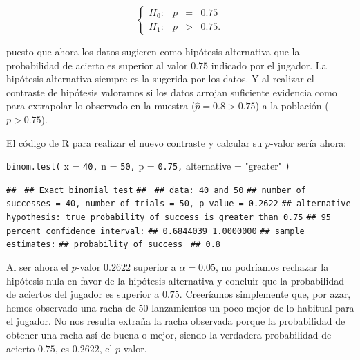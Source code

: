 \documentclass[
  notoc,
  nobib,
  degree=mec]{mnye}
\newenvironment{Shaded}{\begin{snugshade}}{\end{snugshade}}
\newcommand{\AttributeTok}[1]{\textcolor[rgb]{0.77,0.63,0.00}{#1}}
\newcommand{\DecValTok}[1]{\textcolor[rgb]{0.00,0.00,0.81}{#1}}
\newcommand{\FloatTok}[1]{\textcolor[rgb]{0.00,0.00,0.81}{#1}}
\newcommand{\FunctionTok}[1]{\textcolor[rgb]{0.00,0.00,0.00}{#1}}
\newcommand{\NormalTok}[1]{#1}
\newcommand{\StringTok}[1]{\textcolor[rgb]{0.31,0.60,0.02}{#1}}
\renewcommand{\DecValTok}[1]{\textcolor[RGB]{64, 160, 112}{\texttt{#1}}}
\renewcommand{\FloatTok}[1]{\textcolor[RGB]{64, 160, 112}{\texttt{#1}}}
\renewcommand{\FunctionTok}[1]{\textcolor[rgb]{0.13,0.29,0.53}{\texttt{#1}}}
\renewcommand{\NormalTok}[1]{\texttt{#1}}
\begin{document}
\[
  \left\{
  \begin{array}{lrcl}
    H_0:&p&=&0.75\\
    H_1:&p&>&0.75.
  \end{array}
  \right.
\]

puesto que ahora los datos sugieren como hipótesis alternativa que la probabilidad de acierto es superior al valor \(0.75\) indicado por el jugador. La hipótesis alternativa siempre es la sugerida por los datos. Y al realizar el contraste de hipótesis valoramos si los datos arrojan suficiente evidencia como para extrapolar lo observado en la muestra (\(\hat p = 0.8>0.75\)) a la población (\(p>0.75\)).

El código de \textsf{R} para realizar el nuevo contraste y calcular su \(p\)-valor sería ahora:

\begin{Shaded}
\begin{Highlighting}[]
\FunctionTok{binom.test}\NormalTok{(}
  \AttributeTok{x =} \DecValTok{40}\NormalTok{,}
  \AttributeTok{n =} \DecValTok{50}\NormalTok{,}
  \AttributeTok{p =} \FloatTok{0.75}\NormalTok{,}
  \AttributeTok{alternative =} \StringTok{"greater"}
\NormalTok{)}
\end{Highlighting}
\end{Shaded}

\begin{Shaded}
\begin{Highlighting}[]
\NormalTok{\#\# }
\NormalTok{\#\#  Exact binomial test}
\NormalTok{\#\# }
\NormalTok{\#\# data:  40 and 50}
\NormalTok{\#\# number of successes = 40, number of trials = 50, p{-}value = 0.2622}
\NormalTok{\#\# alternative hypothesis: true probability of success is greater than 0.75}
\NormalTok{\#\# 95 percent confidence interval:}
\NormalTok{\#\#  0.6844039 1.0000000}
\NormalTok{\#\# sample estimates:}
\NormalTok{\#\# probability of success }
\NormalTok{\#\#                    0.8}
\end{Highlighting}
\end{Shaded}

Al ser ahora el \(p\)-valor \(0.2622\) superior a \(\alpha=0.05\), no podríamos rechazar la hipótesis nula en favor de la hipótesis alternativa y concluir que la probabilidad de aciertos del jugador es superior a \(0.75\). Creeríamos simplemente que, por azar, hemos observado una racha de \(50\) lanzamientos un poco mejor de lo habitual para el jugador. No nos resulta extraña la racha observada porque la probabilidad de obtener una racha así de buena o mejor, siendo la verdadera probabilidad de acierto \(0.75\), es \(0.2622\), el \(p\)-valor.
\end{document}
